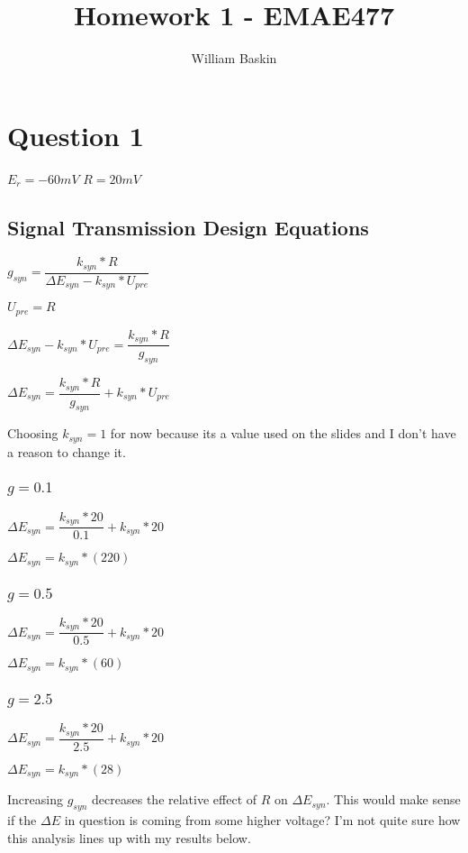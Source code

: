 \documentclass[12pt, letterpaper, oneside, notitlepage, onecolumn]{article}
\author{William Baskin}
\title{Homework 1 - EMAE477}
\begin{document}
\maketitle

\section*{Question 1}


$E_{r} = -60mV$
$R = 20mV$

\subsection{Signal Transmission Design Equations}

$g_{syn} = \dfrac{k_{syn} * R}{\Delta E_{syn} - k_{syn} * U_{pre}}$

$U_{pre} = R$

$\Delta E_{syn} - k_{syn} * U_{pre} = \dfrac{k_{syn} * R}{g_{syn}}$

$\Delta E_{syn} = \dfrac{k_{syn} * R}{g_{syn}} + k_{syn} * U_{pre}$

Choosing $k_{syn} = 1$ for now because its a value used on the slides and I
don't have a reason to change it. 

\subsubsection{$g = 0.1$}

$\Delta E_{syn} = \dfrac{k_{syn} * 20}{0.1} + k_{syn} * 20$

$\Delta E_{syn} = k_{syn} * (220)$

\subsubsection{$g = 0.5$}

$\Delta E_{syn} = \dfrac{k_{syn} * 20}{0.5} + k_{syn} * 20$

$\Delta E_{syn} = k_{syn} * (60)$

\subsubsection{$g = 2.5$}

$\Delta E_{syn} = \dfrac{k_{syn} * 20}{2.5} + k_{syn} * 20$

$\Delta E_{syn} = k_{syn} * (28)$

Increasing $g_{syn}$ decreases the relative effect of $R$ on $\Delta E_{syn}$. This would make sense if the $\Delta E$ in question is coming from some higher voltage? I'm not quite sure how this analysis lines up with my results below.
\end{document}
